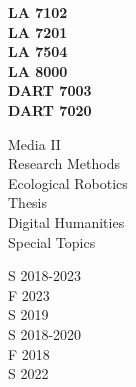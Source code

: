 \documentclass[10pt]{developercv}
\begin{document}
\begin{minipage}[t]{0.13\textwidth}
\textbf{LA 7102}\\
\textbf{LA 7201}\\
\textbf{LA 7504}\\
\textbf{LA 8000}\\
\textbf{DART 7003}\\
\textbf{DART 7020}\\
\end{minipage}
\begin{minipage}[t]{0.21\textwidth}
Media II\\
Research Methods\\
Ecological Robotics\\
Thesis\\
Digital Humanities\\
Special Topics\\
\end{minipage}
\begin{minipage}[t]{0.15\textwidth}
S 2018-2023\\
F 2023\\
S 2019\\
S 2018-2020\\
F 2018\\
S 2022\\
\end{minipage}





\end{document}
